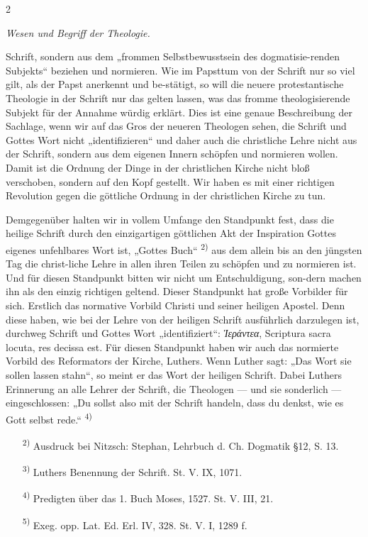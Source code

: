 \begin{center}\begin{minipage}{\textwidth}\begin{flushright}2\end{flushright}\end{minipage}\end{center}\vspace{-2em} \begin{center}\textit{Wesen und Begriff der Theologie.}\end{center}\vspace{1em} \noindent Schrift, sondern aus dem „frommen Selbstbewusstsein des dogmatisie-renden Subjekts“ beziehen und normieren. Wie im Papsttum von der Schrift nur so viel gilt, als der Papst anerkennt und be-stätigt, so will die neuere protestantische Theologie in der Schrift nur das gelten lassen, was das fromme theologisierende Subjekt für der Annahme würdig erklärt. Dies ist eine genaue Beschreibung der Sachlage, wenn wir auf das Gros der neueren Theologen sehen, die Schrift und Gottes Wort nicht „identifizieren“ und daher auch die christliche Lehre nicht aus der Schrift, sondern aus dem eigenen Innern schöpfen und normieren wollen. Damit ist die Ordnung der Dinge in der christlichen Kirche nicht bloß verschoben, sondern auf den Kopf gestellt. Wir haben es mit einer richtigen Revolution gegen die göttliche Ordnung in der christlichen Kirche zu tun.\par Demgegenüber halten wir in vollem Umfange den Standpunkt fest, dass die heilige Schrift durch den einzigartigen göttlichen Akt der Inspiration Gottes eigenes unfehlbares Wort ist, „Gottes Buch“ \textsuperscript{2)} aus dem allein bis an den jüngsten Tag die christ-liche Lehre in allen ihren Teilen zu schöpfen und zu normieren ist. Und für diesen Standpunkt bitten wir nicht um Entschuldigung, son-dern machen ihn als den einzig richtigen geltend. Dieser Standpunkt hat große Vorbilder für sich. Erstlich das normative Vorbild Christi und seiner heiligen Apostel. Denn diese haben, wie bei der Lehre von der heiligen Schrift ausführlich darzulegen ist, durchweg Schrift und Gottes Wort „identifiziert“: \textit{Ἱεράντεα}, Scriptura sacra locuta, res decissa est. Für diesen Standpunkt haben wir auch das normierte Vorbild des Reformators der Kirche, Luthers. Wenn Luther sagt: „Das Wort sie sollen lassen stahn“, so meint er das Wort der heiligen Schrift. Dabei Luthers Erinnerung an alle Lehrer der Schrift, die Theologen — und sie sonderlich — eingeschlossen: „Du sollst also mit der Schrift handeln, dass du denkst, wie es Gott selbst rede.“ \textsuperscript{4)}\par\vspace{1em} \fontsize{9pt}{11pt}\selectfont \begin{enumerate}\item[\textsuperscript{2)}] Ausdruck bei Nitzsch: Stephan, Lehrbuch d. Ch. Dogmatik \S 12, S. 13.\item[\textsuperscript{3)}] Luthers Benennung der Schrift. St. V. IX, 1071.\item[\textsuperscript{4)}] Predigten über das 1. Buch Moses, 1527. St. V. III, 21.\item[\textsuperscript{5)}] Exeg. opp. Lat. Ed. Erl. IV, 328. St. V. I, 1289 f.\end{enumerate}